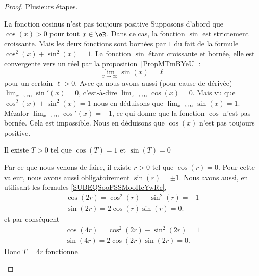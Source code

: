 \begin{proof}
	Plusieurs étapes.
	\begin{subproof}
		\item[La fonction cosinus n'est pas toujours positive]
		Supposons d'abord que \( \cos(x)>0\) pour tout \( x\in \eR\). Dans ce cas, la fonction \( \sin\) est strictement croissante. Mais les deux fonctions sont bornées par \( 1\) du fait de la formule \( \cos^2(x)+\sin^2(x)=1\). La fonction \( \sin\) étant croissante et bornée, elle est convergente vers un réel par la proposition~\ref{PropMTmBYeU} :
		\begin{equation}
			\lim_{x\to \infty} \sin(x)=\ell
		\end{equation}
		pour un certain \( \ell>0\). Avec ça nous avons aussi (pour cause de dérivée) \( \lim_{x\to \infty} \sin'(x)=0\), c'est-à-dire \( \lim_{x\to \infty} \cos(x)=0\). Mais vu que \( \cos^2(x)+\sin^2(x)=1\) nous en déduisons que \( \lim_{x\to \infty} \sin(x)=1\). Mézalor \( \lim_{x\to \infty} \cos'(x)=-1\), ce qui donne que la fonction \( \cos\) n'est pas bornée. Cela est impossible. Nous en déduisons que \( \cos(x)\) n'est pas toujours positive.

		\item[Il existe \( T>0\) tel que \( \cos(T)=1\) et \( \sin(T)=0\)]

		Par ce que nous venons de faire, il existe \( r>0\) tel que \( \cos(r)=0\). Pour cette valeur, nous avons aussi obligatoirement \( \sin(r)=\pm 1\). Nous avons aussi, en utilisant les formules \eqref{SUBEQSooFSSMooHcYwRc},
		\begin{subequations}
			\begin{align}
				\cos(2r)=\cos^2(r)-\sin^2(r)=-1 \\
				\sin(2r)=2\cos(r)\sin(r)=0.
			\end{align}
		\end{subequations}
		et par conséquent
		\begin{subequations}
			\begin{align}
				\cos(4r)=\cos^2(2r)-\sin^2(2r)=1 \\
				\sin(4r)=2\cos(2r)\sin(2r)=0.
			\end{align}
		\end{subequations}
		Donc \( T=4r\) fonctionne.


\end{subproof}
\end{proof}
